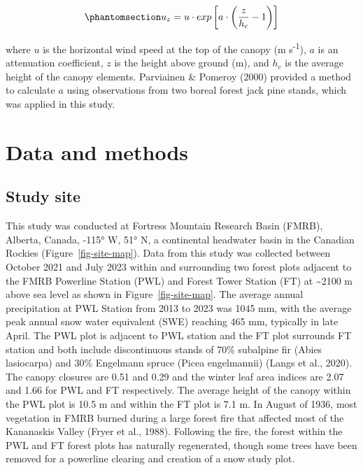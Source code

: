 \documentclass[
  letterpaper,
]{tex/uofsthesis-cs}
\begin{document}
\begin{equation}\phantomsection\label{eq-cionco}{
u_z = u\cdot exp\left[a\cdot\left(\frac{z}{h_c}-1\right)\right]
}\end{equation}

where \(u\) is the horizontal wind speed at the top of the canopy (m
s\textsuperscript{-1}), \(a\) is an attenuation coefficient, \(z\) is
the height above ground (m), and \(h_c\) is the average height of the
canopy elements. Parviainen \& Pomeroy (2000) provided a method to
calculate \(a\) using observations from two boreal forest jack pine
stands, which was applied in this study.

\section{Data and methods}\label{data-and-methods}

\subsection{Study site}\label{study-site}

This study was conducted at Fortress Mountain Research Basin (FMRB),
Alberta, Canada, -115° W, 51° N, a continental headwater basin in the
Canadian Rockies (Figure~\ref{fig-site-map}). Data from this study was
collected between October 2021 and July 2023 within and surrounding two
forest plots adjacent to the FMRB Powerline Station (PWL) and Forest
Tower Station (FT) at \textasciitilde2100 m above sea level as shown in
Figure~\ref{fig-site-map}. The average annual precipitation at PWL
Station from 2013 to 2023 was 1045 mm, with the average peak annual snow
water equivalent (SWE) reaching 465 mm, typically in late April. The PWL
plot is adjacent to PWL station and the FT plot surrounds FT station and
both include discontinuous stands of 70\% subalpine fir (Abies
lasiocarpa) and 30\% Engelmann spruce (Picea engelmannii) (Langs et al.,
2020). The canopy closures are 0.51 and 0.29 and the winter leaf area
indices are 2.07 and 1.66 for PWL and FT respectively. The average
height of the canopy within the PWL plot is 10.5 m and within the FT
plot is 7.1 m. In August of 1936, most vegetation in FMRB burned during
a large forest fire that affected most of the Kananaskis Valley (Fryer
et al., 1988). Following the fire, the forest within the PWL and FT
forest plots has naturally regenerated, though some trees have been
removed for a powerline clearing and creation of a snow study plot.
\end{document}

